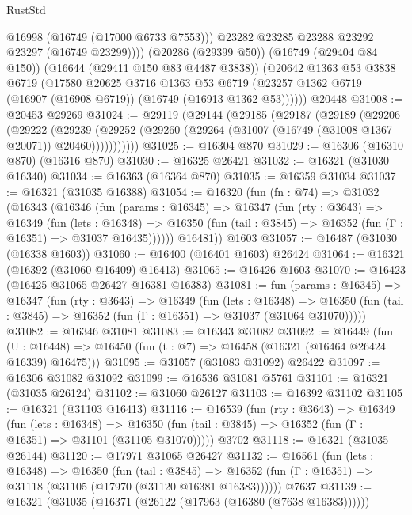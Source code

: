\begin{lexlean}{RustStd}
\begin{coremodule}
              @16998
              (@16749 (@17000 @6733 @7553)))
            @23282
            @23285
            @23288
            @23292
            @23297
            (@16749 @23299))))
      (@20286 (@29399 @50))
      (@16749 (@29404 @84 @150))
      (@16644 (@29411 @150 @83 @4487 @3838))
      (@20642
        @1363
        @53
        @3838
        @6719
        (@17580
          @20625
          @3716
          @1363
          @53
          @6719
          (@23257 @1362 @6719 (@16907 (@16908 @6719)) (@16749 (@16913 @1362 @53))))))
    @20448
@31008 := @20453 @29269
@31024 := @29119
    (@29144
      (@29185
        (@29187
          (@29189
            (@29206
              (@29222
                (@29239
                  (@29252 (@29260 (@29264 (@31007 (@16749 (@31008 @1367 @20071)) @20460)))))))))))
@31025 := @16304 @870
@31029 := @16306 (@16310 @870) (@16316 @870)
@31030 := @16325 @26421
@31032 := @16321 (@31030 @16340)
@31034 := @16363 (@16364 @870)
@31035 := @16359 @31034
@31037 := @16321 (@31035 @16388)
@31054 := @16320
    (fun (fn : @74) =>
    @31032
      (@16343
        (@16346
          (fun (params : @16345) =>
          @16347
            (fun (rty : @3643) =>
            @16349
              (fun (lets : @16348) =>
              @16350 (fun (tail : @3845) => @16352 (fun (Γ : @16351) => @31037 @16435))))))
        @16481))
    @1603
@31057 := @16487 (@31030 (@16338 @1603))
@31060 := @16400 (@16401 @1603) @26424
@31064 := @16321 (@16392 (@31060 @16409) @16413)
@31065 := @16426 @1603
@31070 := @16423 (@16425 @31065 @26427 @16381 @16383)
@31081 := fun (params : @16345) =>
  @16347
    (fun (rty : @3643) =>
    @16349
      (fun (lets : @16348) =>
      @16350 (fun (tail : @3845) => @16352 (fun (Γ : @16351) => @31037 (@31064 @31070)))))
@31082 := @16346 @31081
@31083 := @16343 @31082
@31092 := @16449
    (fun (U : @16448) => @16450 (fun (t : @7) => @16458 (@16321 (@16464 @26424 @16339) @16475)))
@31095 := @31057 (@31083 @31092) @26422
@31097 := @16306 @31082 @31092
@31099 := @16536 @31081 @5761
@31101 := @16321 (@31035 @26124)
@31102 := @31060 @26127
@31103 := @16392 @31102
@31105 := @16321 (@31103 @16413)
@31116 := @16539
    (fun (rty : @3643) =>
    @16349
      (fun (lets : @16348) =>
      @16350 (fun (tail : @3845) => @16352 (fun (Γ : @16351) => @31101 (@31105 @31070)))))
    @3702
@31118 := @16321 (@31035 @26144)
@31120 := @17971 @31065 @26427
@31132 := @16561
    (fun (lets : @16348) =>
    @16350
      (fun (tail : @3845) =>
      @16352 (fun (Γ : @16351) => @31118 (@31105 (@17970 (@31120 @16381 @16383))))))
    @7637
@31139 := @16321 (@31035 (@16371 (@26122 (@17963 (@16380 (@7638 @16383))))))

\end{coremodule}
\end{lexlean}
